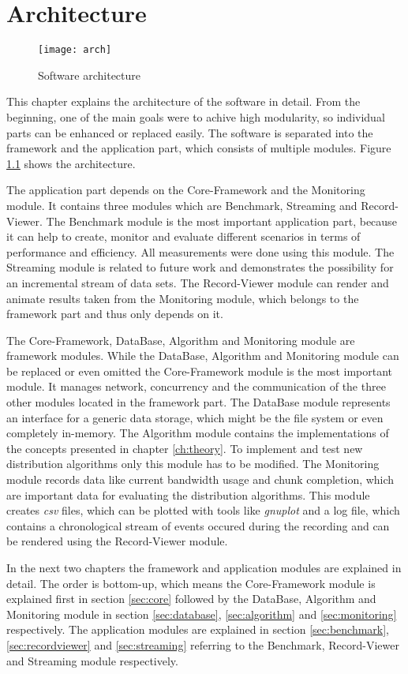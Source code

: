 \chapter{Architecture}
\label{ch:arch}

\begin{figure}[ht]
	\centering
	\texttt{[image: arch]}
	\caption{Software architecture}
	\label{fig:arch}
\end{figure}

This chapter explains the architecture of the software in detail. From the beginning, one of the main goals were to achive high modularity, so individual parts can be enhanced or replaced easily. The software is separated into the framework and the application part, which consists of multiple modules. Figure \ref{fig:arch} shows the architecture. 

The application part depends on the Core-Framework and the Monitoring module. It contains three modules which are Benchmark, Streaming and Record-Viewer. The Benchmark module is the most important application part, because it can help to create, monitor and evaluate different scenarios in terms of performance and efficiency. All measurements were done using this module. The Streaming module is related to future work and demonstrates the possibility for an incremental stream of data sets. The Record-Viewer module can render and animate results taken from the Monitoring module, which belongs to the framework part and thus only depends on it.

The Core-Framework, DataBase, Algorithm and Monitoring module are framework modules. While the DataBase, Algorithm and Monitoring module can be replaced or even omitted the Core-Framework module is the most important module. It manages network, concurrency and the communication of the three other modules located in the framework part. The DataBase module represents an interface for a generic data storage, which might be the file system or even completely in-memory. The Algorithm module contains the implementations of the concepts presented in chapter \ref{ch:theory}. To implement and test new distribution algorithms only this module has to be modified. The Monitoring module records data like current bandwidth usage and chunk completion, which are important data for evaluating the distribution algorithms. This module creates \emph{csv} files, which can be plotted with tools like \emph{gnuplot} and a log file, which contains a chronological stream of events occured during the recording and can be rendered using the Record-Viewer module.

In the next two chapters the framework and application modules are explained in detail. The order is bottom-up, which means the Core-Framework module is explained first in section \ref{sec:core} followed by the DataBase, Algorithm and Monitoring module in section \ref{sec:database}, \ref{sec:algorithm} and \ref{sec:monitoring} respectively. The application modules are explained in section \ref{sec:benchmark}, \ref{sec:recordviewer} and \ref{sec:streaming} referring to the Benchmark, Record-Viewer and Streaming module respectively.